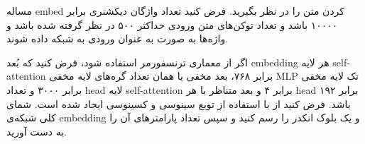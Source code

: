 

 مساله embed کردن متن را در نظر بگیرید. فرض کنید تعداد واژگان دیکشنری برابر ۱۰۰۰۰ باشد و تعداد توکن‌های متن ورودی حداکثر ۵۰۰ در نظر گرفته شده باشد و واژه‌ها به صورت  به‌ عنوان ورودی به شبکه داده شوند.

اگر از معماری ترنسفورمر استفاده شود، فرض کنید که بُعد  embedding هر لایه self-attention برابر ۷۶۸، بعد مخفی یا همان تعداد گره‌های لایه مخفی MLP تک لایه مخفی برابر ۳۰۰۰ و تعداد head لایه self-attention برابر ۴ و بعد متناظر با هر head برابر ۱۹۲ باشد. فرض کنید از  با استفاده از توبع سینوسی و کسینوسی ایجاد شده است. شمای کلی شبکه‌ی 
embedding
و یک بلوک انکدر را رسم کنید و سپس تعداد پارامترهای آن را به دست آورید.